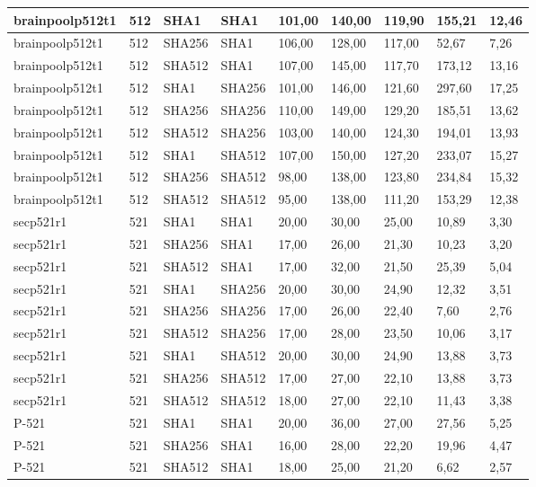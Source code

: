 \begin{longtable}{| l | l | l | l | l |l |l |l |l |}
brainpoolp512t1 & 512 & SHA1 & SHA1 & 101,00 & 140,00 & 119,90 & 155,21 & 12,46 \\ \hline 
brainpoolp512t1 & 512 & SHA256 & SHA1 & 106,00 & 128,00 & 117,00 & 52,67 & 7,26 \\ \hline 
brainpoolp512t1 & 512 & SHA512 & SHA1 & 107,00 & 145,00 & 117,70 & 173,12 & 13,16 \\ \hline 
brainpoolp512t1 & 512 & SHA1 & SHA256 & 101,00 & 146,00 & 121,60 & 297,60 & 17,25 \\ \hline 
brainpoolp512t1 & 512 & SHA256 & SHA256 & 110,00 & 149,00 & 129,20 & 185,51 & 13,62 \\ \hline 
brainpoolp512t1 & 512 & SHA512 & SHA256 & 103,00 & 140,00 & 124,30 & 194,01 & 13,93 \\ \hline 
brainpoolp512t1 & 512 & SHA1 & SHA512 & 107,00 & 150,00 & 127,20 & 233,07 & 15,27 \\ \hline 
brainpoolp512t1 & 512 & SHA256 & SHA512 & 98,00 & 138,00 & 123,80 & 234,84 & 15,32 \\ \hline 
brainpoolp512t1 & 512 & SHA512 & SHA512 & 95,00 & 138,00 & 111,20 & 153,29 & 12,38 \\ \hline 
secp521r1 & 521 & SHA1 & SHA1 & 20,00 & 30,00 & 25,00 & 10,89 & 3,30 \\ \hline 
secp521r1 & 521 & SHA256 & SHA1 & 17,00 & 26,00 & 21,30 & 10,23 & 3,20 \\ \hline 
secp521r1 & 521 & SHA512 & SHA1 & 17,00 & 32,00 & 21,50 & 25,39 & 5,04 \\ \hline 
secp521r1 & 521 & SHA1 & SHA256 & 20,00 & 30,00 & 24,90 & 12,32 & 3,51 \\ \hline 
secp521r1 & 521 & SHA256 & SHA256 & 17,00 & 26,00 & 22,40 & 7,60 & 2,76 \\ \hline 
secp521r1 & 521 & SHA512 & SHA256 & 17,00 & 28,00 & 23,50 & 10,06 & 3,17 \\ \hline 
secp521r1 & 521 & SHA1 & SHA512 & 20,00 & 30,00 & 24,90 & 13,88 & 3,73 \\ \hline 
secp521r1 & 521 & SHA256 & SHA512 & 17,00 & 27,00 & 22,10 & 13,88 & 3,73 \\ \hline 
secp521r1 & 521 & SHA512 & SHA512 & 18,00 & 27,00 & 22,10 & 11,43 & 3,38 \\ \hline 
P-521 & 521 & SHA1 & SHA1 & 20,00 & 36,00 & 27,00 & 27,56 & 5,25 \\ \hline 
P-521 & 521 & SHA256 & SHA1 & 16,00 & 28,00 & 22,20 & 19,96 & 4,47 \\ \hline 
P-521 & 521 & SHA512 & SHA1 & 18,00 & 25,00 & 21,20 & 6,62 & 2,57 \\ \hline 

\end{longtable}
